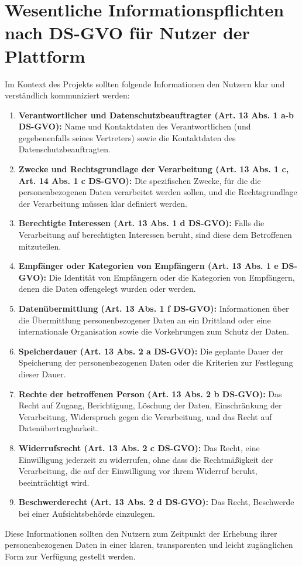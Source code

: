 \chapter{Wesentliche Informationspflichten nach DS-GVO für Nutzer der Plattform}

Im Kontext des Projekts sollten folgende Informationen den Nutzern klar und verständlich kommuniziert werden:

\begin{enumerate}

    \item \textbf{Verantwortlicher und Datenschutzbeauftragter (Art. 13 Abs. 1 a-b DS-GVO):} Name und Kontaktdaten des Verantwortlichen (und gegebenenfalls seines Vertreters) sowie die Kontaktdaten des Datenschutzbeauftragten.

    \item \textbf{Zwecke und Rechtsgrundlage der Verarbeitung (Art. 13 Abs. 1 c, Art. 14 Abs. 1 c DS-GVO):} Die spezifischen Zwecke, für die die personenbezogenen Daten verarbeitet werden sollen, und die Rechtsgrundlage der Verarbeitung müssen klar definiert werden.

    \item \textbf{Berechtigte Interessen (Art. 13 Abs. 1 d DS-GVO):} Falls die Verarbeitung auf berechtigten Interessen beruht, sind diese dem Betroffenen mitzuteilen.

    \item \textbf{Empfänger oder Kategorien von Empfängern (Art. 13 Abs. 1 e DS-GVO):} Die Identität von Empfängern oder die Kategorien von Empfängern, denen die Daten offengelegt wurden oder werden.

    \item \textbf{Datenübermittlung (Art. 13 Abs. 1 f DS-GVO):} Informationen über die Übermittlung personenbezogener Daten an ein Drittland oder eine internationale Organisation sowie die Vorkehrungen zum Schutz der Daten.

    \item \textbf{Speicherdauer (Art. 13 Abs. 2 a DS-GVO):} Die geplante Dauer der Speicherung der personenbezogenen Daten oder die Kriterien zur Festlegung dieser Dauer.

    \item \textbf{Rechte der betroffenen Person (Art. 13 Abs. 2 b DS-GVO):} Das Recht auf Zugang, Berichtigung, Löschung der Daten, Einschränkung der Verarbeitung, Widerspruch gegen die Verarbeitung, und das Recht auf Datenübertragbarkeit.

    \item \textbf{Widerrufsrecht (Art. 13 Abs. 2 c DS-GVO):} Das Recht, eine Einwilligung jederzeit zu widerrufen, ohne dass die Rechtmäßigkeit der Verarbeitung, die auf der Einwilligung vor ihrem Widerruf beruht, beeinträchtigt wird.

    \item \textbf{Beschwerderecht (Art. 13 Abs. 2 d DS-GVO):} Das Recht, Beschwerde bei einer Aufsichtsbehörde einzulegen.
\end{enumerate}

Diese Informationen sollten den Nutzern zum Zeitpunkt der Erhebung ihrer personenbezogenen Daten in einer klaren, transparenten und leicht zugänglichen Form zur Verfügung gestellt werden.